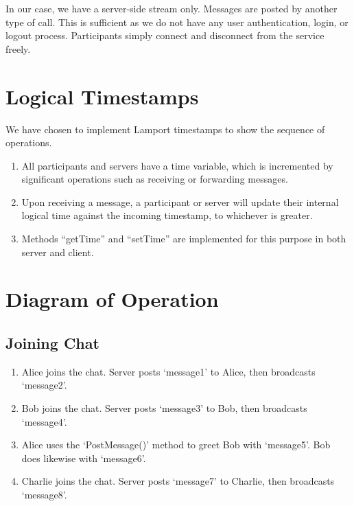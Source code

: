 \documentclass[a4paper,11pt]{article}
\begin{document}
In our case, we have a server-side stream only. Messages are posted by another type of call. This is sufficient as we do not have any user authentication, login, or logout process. Participants simply connect and disconnect from the service freely. 

\section{Logical Timestamps}
We have chosen to implement Lamport timestamps to show the sequence of operations. 

\begin{enumerate}
    \item All participants and servers have a time variable, which is incremented by significant operations such as receiving or forwarding messages. 
    \item Upon receiving a message, a participant or server will update their internal logical time against the incoming timestamp, to whichever is greater. 
    \item Methods ``getTime'' and ``setTime'' are implemented for this purpose in both server and client. 
\end{enumerate}

\section{Diagram of Operation}

\subsection{Joining Chat}

\begin{enumerate}
    \item Alice joins the chat. Server posts `message1' to Alice, then broadcasts `message2'.
    \item Bob joins the chat. Server posts `message3' to Bob, then broadcasts `message4'.
    \item Alice uses the `PostMessage()' method to greet Bob with `message5'. Bob does likewise with `message6'. 
    \item Charlie joins the chat. Server posts `message7' to Charlie, then broadcasts `message8'.
\end{enumerate}
\end{document}
